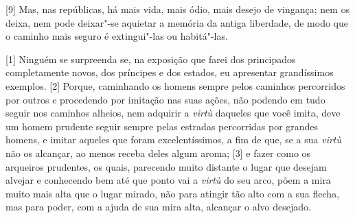 {[}9{]} Mas, nas repúblicas, há mais vida, mais ódio, mais desejo de
vingança; nem os deixa, nem pode deixar"-se aquietar a memória da
antiga liberdade, de modo que o caminho mais seguro é extingui"-las ou
habitá"-las.


{[}1{]} Ninguém se surpreenda se, na exposição que farei dos principados
completamente novos, dos príncipes e dos estados, eu apresentar
grandíssimos exemplos. {[}2{]} Porque, caminhando os homens sempre pelos
caminhos percorridos por outros e procedendo por imitação nas suas
ações, não podendo em tudo seguir nos caminhos alheios, nem adquirir a
\emph{virtù} daqueles que você imita, deve um homem prudente seguir
sempre pelas estradas percorridas por grandes homens, e imitar aqueles
que foram excelentíssimos, a fim de que, se a sua \emph{virtù} não os
alcançar, ao menos receba deles algum aroma; {[}3{]} e fazer como os
arqueiros prudentes, os quais, parecendo muito distante o lugar que
desejam alvejar e conhecendo bem até que ponto vai a \emph{virtù} do seu
arco, põem a mira muito mais alta que o lugar mirado, não para atingir
tão alto com a sua flecha, mas para poder, com a ajuda de sua mira alta,
alcançar o alvo desejado.

